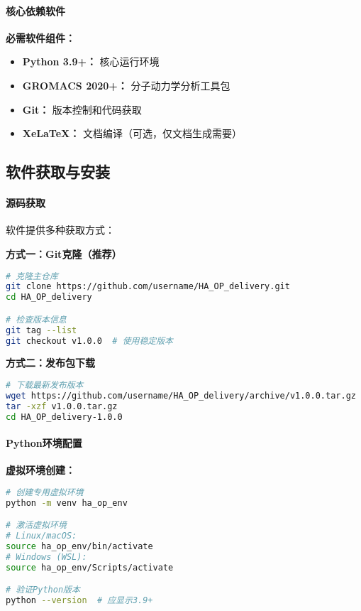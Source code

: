 \paragraph{核心依赖软件}

\textbf{必需软件组件：}
\begin{itemize}
    \item \textbf{Python 3.9+：} 核心运行环境
    \item \textbf{GROMACS 2020+：} 分子动力学分析工具包
    \item \textbf{Git：} 版本控制和代码获取
    \item \textbf{XeLaTeX：} 文档编译（可选，仅文档生成需要）
\end{itemize}

\subsection{软件获取与安装}
\label{subsec:software_installation}

\paragraph{源码获取}

软件提供多种获取方式：

\textbf{方式一：Git克隆（推荐）}
\begin{lstlisting}[language=bash,style=blockstyle]
# 克隆主仓库
git clone https://github.com/username/HA_OP_delivery.git
cd HA_OP_delivery

# 检查版本信息
git tag --list
git checkout v1.0.0  # 使用稳定版本
\end{lstlisting}

\textbf{方式二：发布包下载}
\begin{lstlisting}[language=bash,style=blockstyle]
# 下载最新发布版本
wget https://github.com/username/HA_OP_delivery/archive/v1.0.0.tar.gz
tar -xzf v1.0.0.tar.gz
cd HA_OP_delivery-1.0.0
\end{lstlisting}

\paragraph{Python环境配置}

\textbf{虚拟环境创建：}
\begin{lstlisting}[language=bash,style=blockstyle]
# 创建专用虚拟环境
python -m venv ha_op_env

# 激活虚拟环境
# Linux/macOS:
source ha_op_env/bin/activate
# Windows (WSL):
source ha_op_env/Scripts/activate

# 验证Python版本
python --version  # 应显示3.9+
\end{lstlisting}

